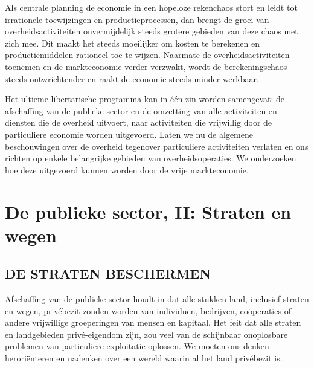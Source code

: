 \documentclass[
  a5paper,
  smalldemyvopaper,10pt,twoside,onecolumn,openright,extrafontsizes,hidelinks]{memoir}
\begin{document}
Als centrale planning de economie in een hopeloze rekenchaos stort en
leidt tot irrationele toewijzingen en productieprocessen, dan brengt de
groei van overheidsactiviteiten onvermijdelijk steeds grotere gebieden
van deze chaos met zich mee. Dit maakt het steeds moeilijker om kosten
te berekenen en productiemiddelen rationeel toe te wijzen. Naarmate de
overheidsactiviteiten toenemen en de markteconomie verder verzwakt,
wordt de berekeningschaos steeds ontwrichtender en raakt de economie
steeds minder werkbaar.

Het ultieme libertarische programma kan in één zin worden samengevat: de
afschaffing van de publieke sector en de omzetting van alle activiteiten
en diensten die de overheid uitvoert, naar activiteiten die vrijwillig
door de particuliere economie worden uitgevoerd. Laten we nu de algemene
beschouwingen over de overheid tegenover particuliere activiteiten
verlaten en ons richten op enkele belangrijke gebieden van
overheidsoperaties. We onderzoeken hoe deze uitgevoerd kunnen worden
door de vrije markteconomie.


\chapter{De publieke sector, II: Straten en
wegen}\label{de-publieke-sector-ii-straten-en-wegen}

\section{DE STRATEN BESCHERMEN}\label{de-straten-beschermen}

Afschaffing van de publieke sector houdt in dat alle stukken land,
inclusief straten en wegen, privébezit zouden worden van individuen,
bedrijven, coöperaties of andere vrijwillige groeperingen van mensen en
kapitaal. Het feit dat alle straten en landgebieden privé-eigendom zijn,
zou veel van de schijnbaar onoplosbare problemen van particuliere
exploitatie oplossen. We moeten ons denken heroriënteren en nadenken
over een wereld waarin al het land privébezit is.
\end{document}
